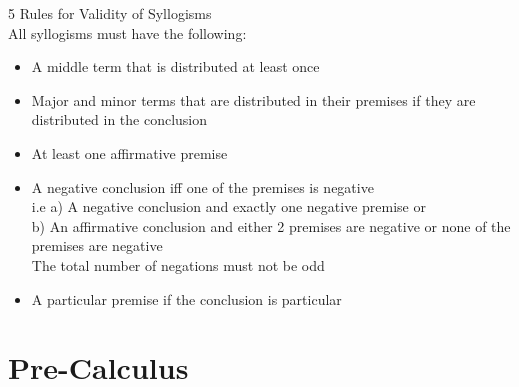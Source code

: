 \documentclass[11pt, fleqn]{article}
\begin{document}
5 Rules for Validity of Syllogisms\\
All syllogisms must have the following:
\begin{itemize}
    \item A middle term that is distributed at least once
    \item Major and minor terms that are distributed in their premises if they are distributed in the conclusion
    \item At least one affirmative premise
    \item A negative conclusion iff one of the premises is negative\\
    i.e a) A negative conclusion and exactly one negative premise or\\
    b) An affirmative conclusion and either 2 premises are negative or none of the premises are negative\\
    The total number of negations must not be odd
    \item A particular premise if the conclusion is particular
\end{itemize}


































































\section{Pre-Calculus}
\end{document}
